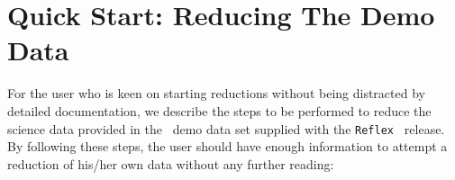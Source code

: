 \section{Quick Start: Reducing The Demo Data \label{sec:quick_start}}

For the user who is keen on starting reductions without being
distracted by detailed documentation, we describe the steps to be
performed to reduce the science data provided in the \instname\, demo
data set 
supplied with the {\tt Reflex~} release. By following these
steps, the user should have enough information to attempt a reduction
of his/her own data without any further reading:



